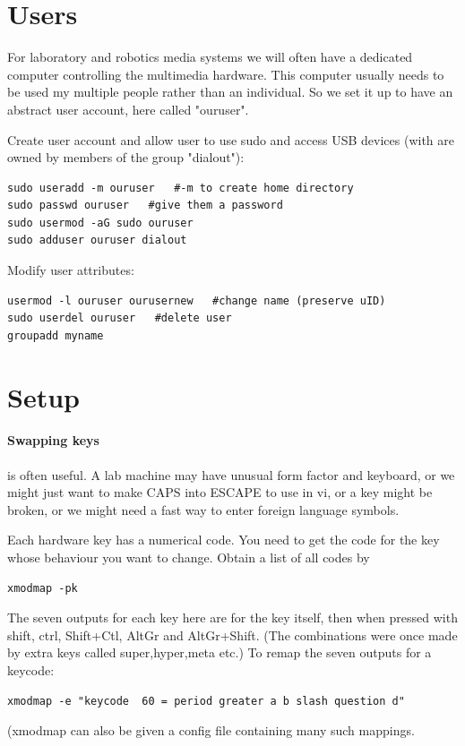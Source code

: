 \documentclass[oneside,english]{scrbook}
\begin{document}
\section{Users}
For laboratory and robotics media systems we will often have a dedicated computer controlling the multimedia hardware.  This computer usually needs to be used my multiple people rather than an individual.   So we set it up to have an abstract user account, here called "ouruser".

Create user account and allow user to use sudo and access USB devices (with are owned by members of the group "dialout"):
\begin{lstlisting}
sudo useradd -m ouruser   #-m to create home directory
sudo passwd ouruser   #give them a password
sudo usermod -aG sudo ouruser
sudo adduser ouruser dialout
\end{lstlisting}

Modify user attributes:
\begin{lstlisting}
usermod -l ouruser ourusernew   #change name (preserve uID)
sudo userdel ouruser   #delete user
groupadd myname
\end{lstlisting}



\section{Setup}

\paragraph{Swapping keys} is often useful.  A lab machine may have unusual form factor and keyboard, or we might just want to make CAPS into ESCAPE to use in vi, or a key might be broken, or we might need a fast way to enter foreign language symbols.

Each hardware key has a numerical code. You need to get the code for the key whose behaviour you want to change.  Obtain a list of all codes by
\begin{lstlisting}
xmodmap -pk
\end{lstlisting}

The seven outputs for each key here are for the key itself, then when pressed with shift, ctrl, Shift+Ctl, AltGr and AltGr+Shift.  (The combinations were once made by extra keys called super,hyper,meta etc.)   To remap the seven outputs for a keycode:

\begin{lstlisting}
xmodmap -e "keycode  60 = period greater a b slash question d"
\end{lstlisting}
(xmodmap can also be given a config file containing many such mappings.  
\end{document}

